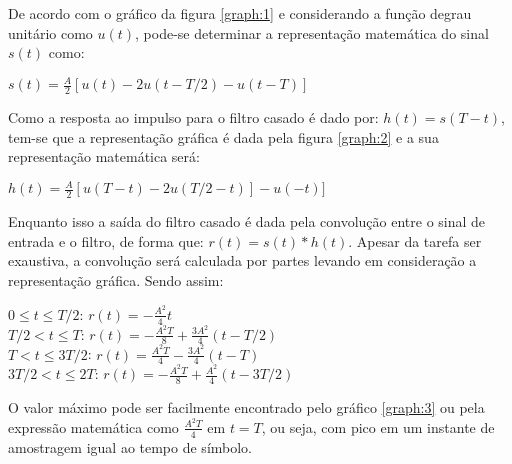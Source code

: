 \begin{subquestion}
    \item De acordo com o gráfico da figura \ref{graph:1} e considerando a função degrau unitário como $u(t)$, pode-se determinar a representação matemática do sinal $s(t)$ como:
    
    \begin{center}
        $s(t) = \frac{A}{2}[u(t) - 2u(t-T/2) - u(t-T)]$
    \end{center}
    
    
    Como a resposta ao impulso para o filtro casado é dado por: $h(t) = s(T-t)$, tem-se que a representação gráfica é dada pela figura \ref{graph:2} e a sua representação matemática será:
    
    \begin{center}
        $h(t) = \frac{A}{2}[u(T-t) - 2u(T/2-t)] - u(-t)]$
    \end{center}
    
    
    
    \item Enquanto isso a saída do filtro casado é dada pela convolução entre o sinal de entrada e o filtro, de forma que: $r(t) = s(t) \ast h(t)$. Apesar da tarefa ser exaustiva, a convolução será calculada por partes levando em consideração a representação gráfica. Sendo assim:
    
    \begin{center}
        $0 \leq t \leq T/2$: $r(t) = -\frac{A^2}{4}t$ \\ \vspace{2pt}
        $T/2 < t \leq T$: $r(t) = -\frac{A^2T}{8} + \frac{3A^2}{4}(t-T/2)$ \\ \vspace{2pt}
        $T < t \leq 3T/2$: $r(t) = \frac{A^2T}{4} - \frac{3A^2}{4}(t-T)$ \\ \vspace{1pt}
        $3T/2 < t \leq 2T$: $r(t) = -\frac{A^2T}{8} + \frac{A^2}{4}(t-3T/2)$ \\ \vspace{1pt}
    \end{center}
    
    
    
    \item O valor máximo pode ser facilmente encontrado pelo gráfico \ref{graph:3} ou pela expressão matemática como $\frac{A^2T}{4}$ em $t=T$, ou seja, com pico em um instante de amostragem igual ao tempo de símbolo.
\end{subquestion}

\newpage